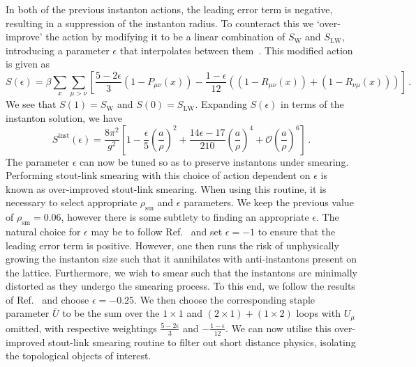 In both of the previous instanton actions, the leading error term is negative, resulting in a suppression of the instanton radius. To counteract this we `over-improve' the action by modifying it to be a linear combination of $S_\text{W}$ and $S_\text{LW}$, introducing a parameter $\epsilon$ that interpolates between them~\cite{Moran:2008ra}. This modified action is given as
%
\begin{equation}
S ( \epsilon ) =  \beta \sum _ { x } \sum _ { \mu > \nu } \left[ \frac { 5 - 2 \epsilon } { 3 } \left( 1 - P _ { \mu \nu } ( x ) \right) - \frac { 1 - \epsilon } { 12 } \left( \left( 1 - R _ { \mu \nu } ( x ) \right) + \left( 1 - R _ { \nu \mu } ( x ) \right) \right) \right]\, .
\end{equation}
%
We see that $S(1)=S_\text{W}$ and $S(0) = S_\text{LW}$. Expanding $S(\epsilon)$ in terms of the instanton solution, we have
%
\begin{equation}
S^\text{inst}(\epsilon) = \frac { 8 \pi ^ { 2 } } { g ^ { 2 } } \left[ 1 - \frac { \epsilon } { 5 } \left( \frac { a } { \rho  } \right) ^ { 2 } + \frac { 14 \epsilon - 17 } { 210 } \left( \frac { a } { \rho } \right) ^ { 4 } + \mathcal { O } \left( \frac{a}{\rho} \right) ^ { 6 } \right]\, .
\end{equation}
%
The parameter $\epsilon$ can now be tuned so as to preserve instantons under smearing. Performing stout-link smearing with this choice of action dependent on $\epsilon$ is known as over-improved stout-link smearing. When using this routine, it is necessary to select appropriate $\rho_{\text{sm}}$ and $\epsilon$ parameters. We keep the previous value of $\rho_{\text{sm}}=0.06$, however there is some subtlety to finding an appropriate $\epsilon$. The natural choice for $\epsilon$ may be to follow Ref.~\cite{GarciaPerez:1993lic} and set $\epsilon=-1$ to ensure that the leading error term is positive. However, one then runs the risk of unphysically growing the instanton size such that it annihilates with anti-instantons present on the lattice. Furthermore, we wish to smear such that the instantons are minimally distorted as they undergo the smearing process. To this end, we follow the results of Ref.~\cite{Moran:2008ra} and choose $\epsilon = -0.25$. We then choose the corresponding staple parameter $\bar{U}$ to be the sum over the $1\times 1$ and $(2\times 1) + (1\times 2)$ loops with $U_\mu$ omitted, with respective weightings $\frac{5-2\epsilon}{3}$ and $-\frac{1-\epsilon}{12}$. We can now utilise this over-improved stout-link smearing routine to filter out short distance physics, isolating the topological objects of interest.

